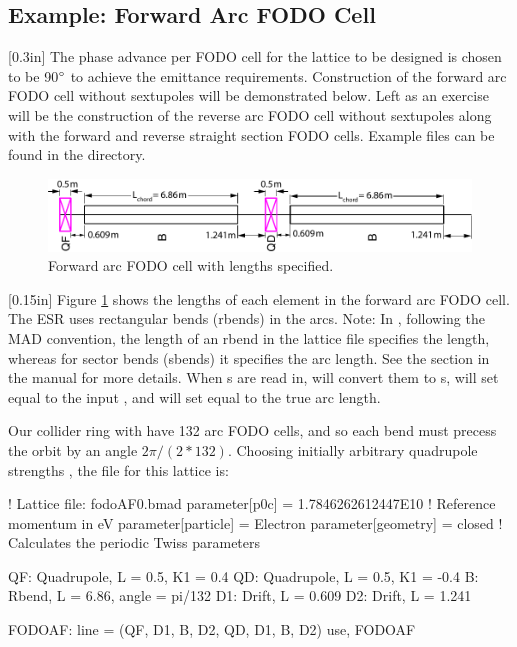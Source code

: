 \documentclass{hitec}     %
\begin{document}
\subsection{Example: Forward Arc FODO Cell}

[0.3in]
%
The phase advance per FODO cell for the lattice to be designed is chosen to be 90$\degree$ to achieve the emittance requirements. Construction of the forward arc FODO cell without sextupoles will be
demonstrated below. Left as an exercise will be the construction of the reverse arc FODO cell without sextupoles along with the forward and reverse straight section FODO cells. Example files can be found in the  directory.

\begin{figure}[h!]
  \includegraphics*[width=0.95\columnwidth]{figures/FODOaf-dim.pdf}
  \caption{\label{f:FODOaf}Forward arc FODO cell with lengths specified.}
\end{figure}

[0.15in]
%
Figure \ref{f:FODOaf} shows the lengths of each element in the forward arc FODO cell. The ESR uses rectangular bends (rbends) in the arcs. 
Note: In \bmad, following the MAD convention, the length  of an rbend in the lattice file specifies the 
 length, whereas for sector bends (sbends) it specifies the arc length.
See the  section in the \bmad manual for more details. 
When s are read in, \bmad will convert them to s, will set 
equal to the input , and will set  equal to the true arc length.

Our collider ring with have 132 arc FODO cells, and so each bend must precess the orbit by an angle $2\pi/(2 * 132)$. Choosing initially arbitrary quadrupole strengths , the \bmad file for this lattice is:
\begin{code}
! Lattice file: fodoAF0.bmad
parameter[p0c]      = 1.7846262612447E10 ! Reference momentum in eV
parameter[particle] = Electron 
parameter[geometry] = closed ! Calculates the periodic Twiss parameters

QF: Quadrupole, L = 0.5, K1 =  0.4
QD: Quadrupole, L = 0.5, K1 = -0.4
B: Rbend, L = 6.86, angle = pi/132
D1: Drift, L = 0.609
D2: Drift, L = 1.241

FODOAF: line = (QF, D1, B, D2, QD, D1, B, D2)
use, FODOAF
\end{code}
\end{document}
